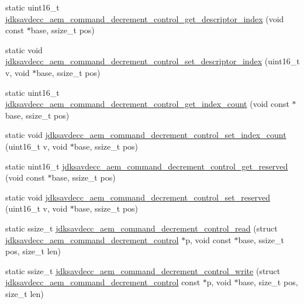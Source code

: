 \begin{DoxyCompactItemize}
\item 
static uint16\+\_\+t \hyperlink{group__command__decrement__control_ga8c0c47c13c35b5d5eb0e34e2b7c77b72}{jdksavdecc\+\_\+aem\+\_\+command\+\_\+decrement\+\_\+control\+\_\+get\+\_\+descriptor\+\_\+index} (void const $\ast$base, ssize\+\_\+t pos)
\item 
static void \hyperlink{group__command__decrement__control_ga0c4808c389024e253265a852f16ada23}{jdksavdecc\+\_\+aem\+\_\+command\+\_\+decrement\+\_\+control\+\_\+set\+\_\+descriptor\+\_\+index} (uint16\+\_\+t v, void $\ast$base, ssize\+\_\+t pos)
\item 
static uint16\+\_\+t \hyperlink{group__command__decrement__control_ga77957d3ada567a5078ec737755b2abcb}{jdksavdecc\+\_\+aem\+\_\+command\+\_\+decrement\+\_\+control\+\_\+get\+\_\+index\+\_\+count} (void const $\ast$base, ssize\+\_\+t pos)
\item 
static void \hyperlink{group__command__decrement__control_ga123a17b9b8a053db1f761f86e35bdb0e}{jdksavdecc\+\_\+aem\+\_\+command\+\_\+decrement\+\_\+control\+\_\+set\+\_\+index\+\_\+count} (uint16\+\_\+t v, void $\ast$base, ssize\+\_\+t pos)
\item 
static uint16\+\_\+t \hyperlink{group__command__decrement__control_gad30bb4de0fd338853a37a63116afcbdb}{jdksavdecc\+\_\+aem\+\_\+command\+\_\+decrement\+\_\+control\+\_\+get\+\_\+reserved} (void const $\ast$base, ssize\+\_\+t pos)
\item 
static void \hyperlink{group__command__decrement__control_gaf838fb18396526abdeb310dd2658ab21}{jdksavdecc\+\_\+aem\+\_\+command\+\_\+decrement\+\_\+control\+\_\+set\+\_\+reserved} (uint16\+\_\+t v, void $\ast$base, ssize\+\_\+t pos)
\item 
static ssize\+\_\+t \hyperlink{group__command__decrement__control_ga5b45db193ca2bed9a17bbfa32b50ff33}{jdksavdecc\+\_\+aem\+\_\+command\+\_\+decrement\+\_\+control\+\_\+read} (struct \hyperlink{structjdksavdecc__aem__command__decrement__control}{jdksavdecc\+\_\+aem\+\_\+command\+\_\+decrement\+\_\+control} $\ast$p, void const $\ast$base, ssize\+\_\+t pos, size\+\_\+t len)
\item 
static ssize\+\_\+t \hyperlink{group__command__decrement__control_gab040576b124d35f7b05f6d2b531e52ed}{jdksavdecc\+\_\+aem\+\_\+command\+\_\+decrement\+\_\+control\+\_\+write} (struct \hyperlink{structjdksavdecc__aem__command__decrement__control}{jdksavdecc\+\_\+aem\+\_\+command\+\_\+decrement\+\_\+control} const $\ast$p, void $\ast$base, size\+\_\+t pos, size\+\_\+t len)
\end{DoxyCompactItemize}


